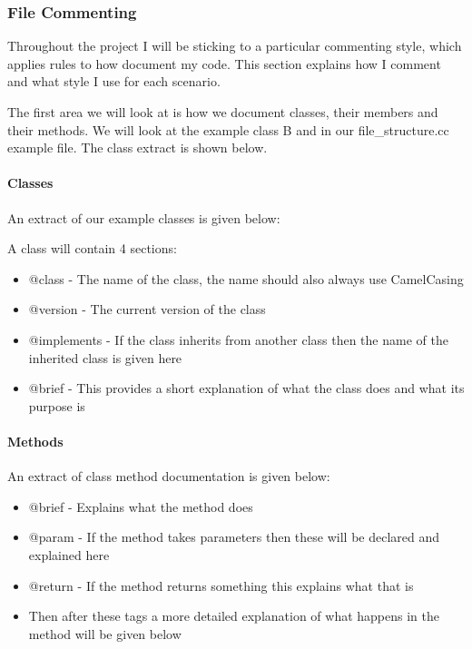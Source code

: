 \subsubsection{File Commenting}

Throughout the project I will be sticking to a particular commenting style, which applies rules to how document my code. This section explains how I comment and what style I use for each scenario.

The first area we will look at is how we document classes, their members and their methods. We will look at the example class B and in our file_structure.cc example file. The class extract is shown below.

\paragraph{Classes}

An extract of our example classes is given below:



A class will contain 4 sections:
\begin{itemize}
\item{@class - The name of the class, the name should also always use CamelCasing}
\item{@version - The current version of the class}
\item{@implements - If the class inherits from another class then the name of the inherited class is given here}
\item{@brief - This provides a short explanation of what the class does and what its purpose is}
\end{itemize}

\paragraph{Methods}

An extract of class method documentation is given below:



\begin{itemize}
\item{@brief - Explains what the method does}
\item{@param - If the method takes parameters then these will be declared and explained here}
\item{@return - If the method returns something this explains what that is}
\item{Then after these tags a more detailed explanation of what happens in the method will be given below}
\end{itemize}

